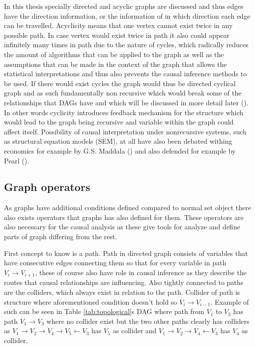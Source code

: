 \documentclass[main=english,12pt,a4paper,pdftex,econ,utf8]{aaltothesis}
\begin{document}
In this thesis specially directed and acyclic graphs are discussed and thus edges have the direction information, or the information of in which direction each edge can be travelled. Acyclicity means that one vertex cannot exist twice in any possible path. In case vertex would exist twice in path it also could appear infinitely many times in path due to the nature of cycles, which radically reduces the amount of algorithms that can be applied to the graph as well as the assumptions that can be made in the context of the graph that allows the statistical interpretations and thus also prevents the causal inference methods to be used. If there would exist cycles the graph would thus be directed cyclical graph and as such fundamentally non recursive which would break some of the relationships that DAGs have and which will be discussed in more detail later (\cite{Heckman2015}). In other words cyclicity introduces feedback mechanism for the structure which would lead to the graph being recursive and variable within the graph could affect itself. Possibility of causal interpretation under nonrecursive systems, such as  structural equation models (SEM), at all have also been debated withing economics for example by G.S. Maddala (\cite{Maddala1986}) and also defended for example by Pearl (\cite{Pearl1998}).

\subsection{Graph operators}

As graphs have additional conditions defined compared to normal set object there also exists operators that graphs has also defined for them. These operators are also necessary for the causal analysis as these give tools for analyze and define parts of graph differing from the rest.

First concept to know is a path. Path in directed graph consists of variables that have consecutive edges connecting them so that for every variable in path $V_{i}\rightarrow V_{i+1}$, these of course also have role in causal inference as they describe the routes that causal relationships are influencing. Also tightly connected to paths are the colliders, which always exist in relation to the path. Collider of path is structure where aforementioned condition doesn't hold so $V_{i}\rightarrow V_{i-1}$. Example of such can be seen in Table \ref{tab:topological}s DAG where path from $V_{1}$ to $V_{3}$ has path $V_{1}\rightarrow V_{3}$ where no collider exist but the two other paths clearly has colliders as $V_{1}\rightarrow V_{2}\rightarrow V_{4}\rightarrow V_{5}\leftarrow V_{3}$ has $V_{5}$ as collider and $V_{1}\rightarrow V_{2}\rightarrow V_{4}\leftarrow V_{3}$ has $V_{4}$ as collider.
\end{document}
